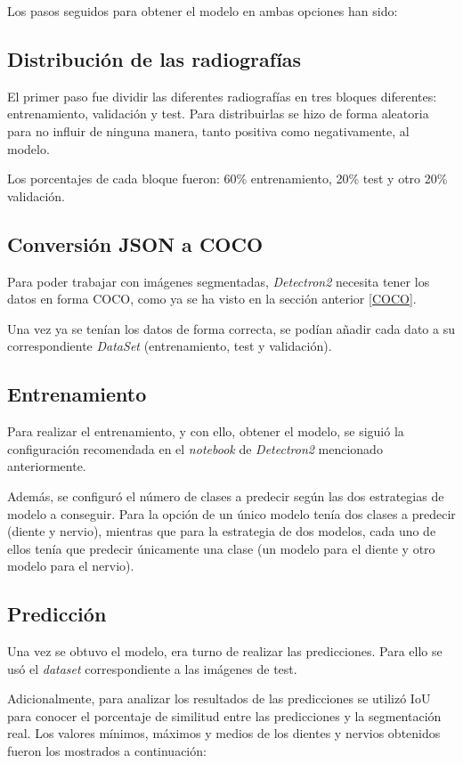 Los pasos seguidos para obtener el modelo en ambas opciones han sido:

\subsection{Distribución de las radiografías}
El primer paso fue dividir las diferentes radiografías en tres bloques diferentes: entrenamiento, validación y test. Para distribuirlas se hizo de forma aleatoria para no influir de ninguna manera, tanto positiva como negativamente, al modelo.

Los porcentajes de cada bloque fueron: 60\% entrenamiento, 20\% test y otro 20\% validación.

\subsection{Conversión JSON a COCO}
Para poder trabajar con imágenes segmentadas, \emph{Detectron2} necesita tener los datos en forma COCO, como ya se ha visto en la sección anterior \ref{COCO}.

Una vez ya se tenían los datos de forma correcta, se podían añadir cada dato a su correspondiente \emph{DataSet} (entrenamiento, test y validación).

\subsection{Entrenamiento}
Para realizar el entrenamiento, y con ello, obtener el modelo, se siguió la configuración recomendada en el \emph{notebook} de \emph{Detectron2} mencionado anteriormente. 

Además, se configuró el número de clases a predecir según las dos estrategias de modelo a conseguir. Para la opción de un único modelo tenía dos clases a predecir (diente y nervio), mientras que para la estrategia de dos modelos, cada uno de ellos tenía que predecir únicamente una clase (un modelo para el diente y otro modelo para el nervio).

\subsection{Predicción}
Una vez se obtuvo el modelo, era turno de realizar las predicciones. Para ello se usó el \emph{dataset} correspondiente a las imágenes de test. 

Adicionalmente, para analizar los resultados de las predicciones se utilizó IoU para conocer el porcentaje de similitud entre las predicciones y la segmentación real. Los valores mínimos, máximos y medios de los dientes y nervios obtenidos fueron los mostrados a continuación:


